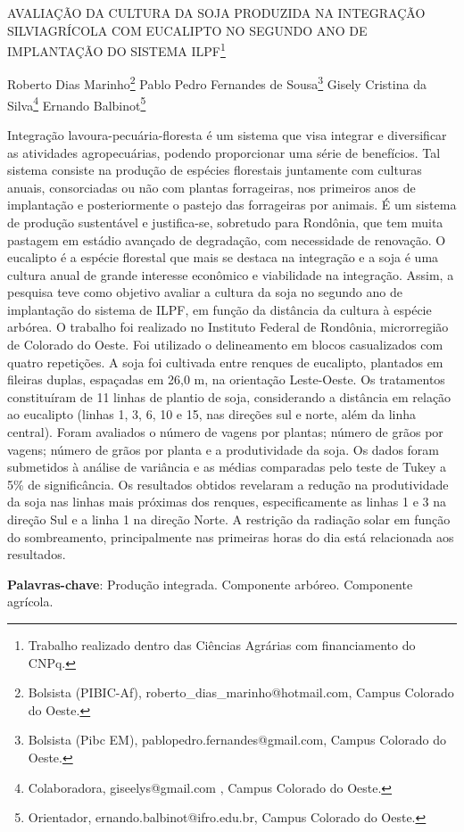 \documentclass[article,12pt,onesidea,4paper,english,brazil]{abntex2}
\begin{document}
	
	
	\frenchspacing 
	
	\begin{center}
		\LARGE AVALIAÇÃO DA CULTURA DA SOJA PRODUZIDA NA INTEGRAÇÃO
		SILVIAGRÍCOLA COM EUCALIPTO NO SEGUNDO ANO DE IMPLANTAÇÃO DO SISTEMA ILPF\footnote{Trabalho realizado dentro das Ciências Agrárias com financiamento do CNPq.}
		
		\normalsize
		Roberto Dias Marinho\footnote{Bolsista (PIBIC-Af), roberto\_dias\_marinho@hotmail.com, Campus Colorado do Oeste.} 
		Pablo Pedro Fernandes de Sousa\footnote{Bolsista (Pibc EM), pablopedro.fernandes@gmail.com, Campus Colorado do Oeste.} 
		Gisely Cristina da Silva\footnote{Colaboradora, giseelys@gmail.com , Campus Colorado do Oeste.} 
		Ernando Balbinot\footnote{Orientador, ernando.balbinot@ifro.edu.br, Campus Colorado do Oeste.} 
	\end{center}
	
	\noindent Integração lavoura-pecuária-floresta é um sistema que visa integrar e diversificar as
	atividades agropecuárias, podendo proporcionar uma série de benefícios. Tal
	sistema consiste na produção de espécies florestais juntamente com culturas
	anuais, consorciadas ou não com plantas forrageiras, nos primeiros anos de
	implantação e posteriormente o pastejo das forrageiras por animais. É um sistema
	de produção sustentável e justifica-se, sobretudo para Rondônia, que tem muita
	pastagem em estádio avançado de degradação, com necessidade de renovação. O
	eucalipto é a espécie florestal que mais se destaca na integração e a soja é uma
	cultura anual de grande interesse econômico e viabilidade na integração. Assim, a
	pesquisa teve como objetivo avaliar a cultura da soja no segundo ano de
	implantação do sistema de ILPF, em função da distância da cultura à espécie
	arbórea. O trabalho foi realizado no Instituto Federal de Rondônia, microrregião de
	Colorado do Oeste. Foi utilizado o delineamento em blocos casualizados com quatro
	repetições. A soja foi cultivada entre renques de eucalipto, plantados em fileiras
	duplas, espaçadas em 26,0 m, na orientação Leste-Oeste. Os tratamentos
	constituíram de 11 linhas de plantio de soja, considerando a distância em relação ao
	eucalipto (linhas 1, 3, 6, 10 e 15, nas direções sul e norte, além da linha central).
	Foram avaliados o número de vagens por plantas; número de grãos por vagens;
	número de grãos por planta e a produtividade da soja. Os dados foram submetidos à
	análise de variância e as médias comparadas pelo teste de Tukey a 5\% de
	significância. Os resultados obtidos revelaram a redução na produtividade da soja
	nas linhas mais próximas dos renques, especificamente as linhas 1 e 3 na direção
	Sul e a linha 1 na direção Norte. A restrição da radiação solar em função do
	sombreamento, principalmente nas primeiras horas do dia está relacionada aos
	resultados.
	
	\vspace{\onelineskip}
	
	\noindent
	\textbf{Palavras-chave}: Produção integrada. Componente arbóreo. Componente agrícola.
	
\end{document}
